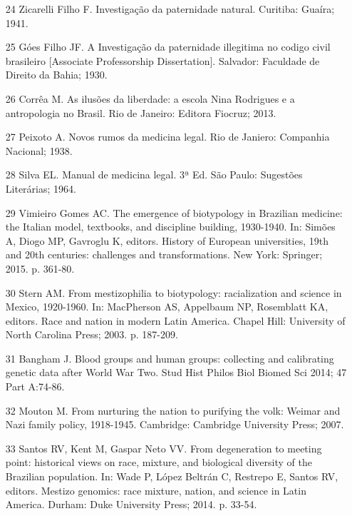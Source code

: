 \documentclass{article}
\begin{document}
\begin{itemize}
\item[24] Zicarelli Filho F. Investigação da paternidade natural. Curitiba:
Guaíra; 1941.

\item[25] Góes Filho JF. A Investigação da paternidade illegitima no codigo
civil brasileiro [Associate Professorship Dissertation]. Salvador: Faculdade de
Direito da Bahia; 1930.

\item[26] Corrêa M. As ilusões da liberdade: a escola Nina Rodrigues e a
antropologia no Brasil. Rio de Janeiro: Editora Fiocruz; 2013.

\item[27] Peixoto A. Novos rumos da medicina legal. Rio de Janiero:
Companhia Nacional; 1938.

\item[28] Silva EL. Manual de medicina legal. 3ª Ed. São Paulo: Sugestões
Literárias; 1964.

\item[29] Vimieiro Gomes AC. The emergence of biotypology in Brazilian
medicine: the Italian model, textbooks, and discipline building, 1930-1940. In:
Simões A, Diogo MP, Gavroglu K, editors. History of European universities, 19th
and 20th centuries: challenges and transformations. New York: Springer; 2015. p.
361-80.

\item[30] Stern AM. From mestizophilia to biotypology: racialization and
science in Mexico, 1920-1960. In: MacPherson AS, Appelbaum NP, Rosemblatt KA,
editors. Race and nation in modern Latin America. Chapel Hill: University of
North Carolina Press; 2003. p. 187-209.

\item[31] Bangham J. Blood groups and human groups: collecting and
calibrating genetic data after World War Two. Stud Hist Philos Biol Biomed Sci
2014; 47 Part A:74-86.

\item[32] Mouton M. From nurturing the nation to purifying the volk: Weimar
and Nazi family policy, 1918-1945. Cambridge: Cambridge University Press; 2007.

\item[33] Santos RV, Kent M, Gaspar Neto VV. From degeneration to meeting
point: historical views on race, mixture, and biological diversity of the
Brazilian population. In: Wade P, López Beltrán C, Restrepo E, Santos RV,
editors. Mestizo genomics: race mixture, nation, and science in Latin America.
Durham: Duke University Press; 2014. p. 33-54.


\end{itemize}
\end{document}
